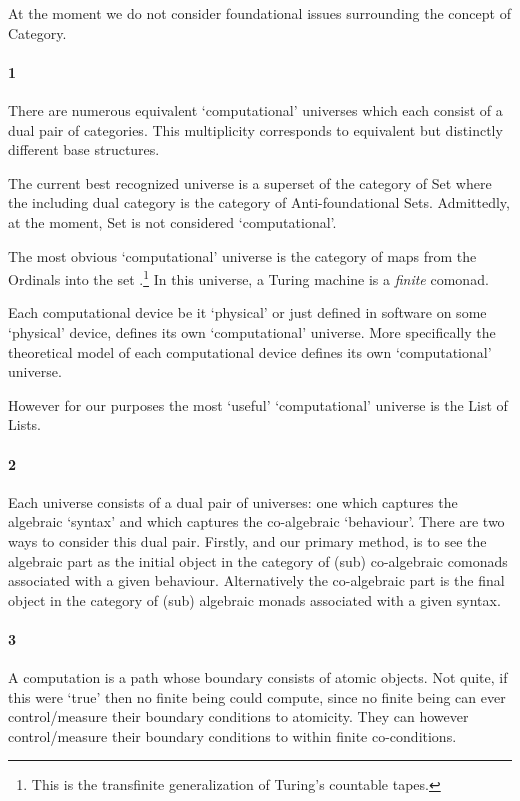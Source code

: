 
At the moment we do not consider foundational issues surrounding the concept of Category.

\paragraph{1}

There are numerous equivalent `computational' universes which each consist of a
dual pair of categories. This multiplicity corresponds to equivalent but
distinctly different base structures.

The current best recognized universe is a superset of the category of Set where
the including dual category is the category of Anti-foundational Sets.
Admittedly, at the moment, Set is not considered `computational'.

The most obvious `computational' universe is the category of maps from the
Ordinals into the set .\footnote{This is the
transfinite generalization of Turing's countable tapes.} In this universe, a
Turing machine is a \emph{finite} comonad.

Each computational device be it `physical' or just defined in software on some
`physical' device, defines its own `computational' universe. More specifically
the theoretical model of each computational device defines its own
`computational' universe.

However for our purposes the most `useful' `computational' universe is the List of Lists.

\paragraph{2}

Each universe consists of a dual pair of universes: one which captures the
algebraic `syntax' and which captures the co-algebraic `behaviour'. There are
two ways to consider this dual pair. Firstly, and our primary method, is to see
the algebraic part as the initial object in the category of (sub) co-algebraic
comonads associated with a given behaviour. Alternatively the co-algebraic part
is the final object in the category of (sub) algebraic monads associated with a
given syntax.

\paragraph{3}

A computation is a path whose boundary consists of atomic objects. Not quite, if
this were `true' then no finite being could compute, since no finite being can
ever control/measure their boundary conditions to atomicity. They can however
control/measure their boundary conditions to within finite co-conditions.

